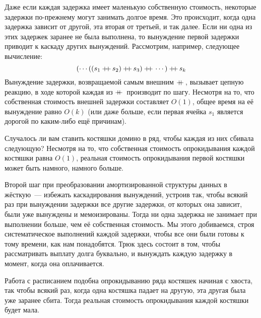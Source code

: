 Даже если каждая задержка имеет маленькую собственную стоимость,
некоторые задержки по-прежнему могут занимать долгое время. Это
происходит, когда одна задержка зависит от другой, эта вторая от
третьей, и так далее. Если ни одна из этих задержек заранее не была
выполнена, то вынуждение первой задержки приводит к каскаду других
вынуждений. Рассмотрим, например, следующее вычисление:
$$
(\cdots((s_1 \concat s_2) \concat s_3) \concat \cdots) \concat s_k
$$
Вынуждение задержки, возвращаемой самым внешним $+\!\!\!+\,$, вызывает
цепную реакцию, в ходе которой каждая из $+\!\!\!+\,$ производит по
шагу. Несмотря на то, что собственная стоимость внешней задержки
составляет $O(1)$, общее время на её вынуждение равно $O(k)$ (или даже
больше, если первая ячейка $s_1$ является дорогой по каким-либо ещё
причинам).
\begin{remark}
  Случалось ли вам ставить костяшки домино в ряд, чтобы каждая из них
  сбивала следующую? Несмотря на то, что собственная стоимость опрокидывания
  каждой костяшки равна $O(1)$, реальная стоимость опрокидывания первой
  костяшки может быть намного, намного больше.
\end{remark}

Второй шаг при преобразовании амортизированной структуры данных в
жёсткую~--- избежать каскадирования вынуждений, устроив так, чтобы
всякий раз при вынуждении задержки все другие задержки, от которых она
зависит, были уже вынуждены и мемоизированы. Тогда ни одна задержка не
занимает при выполнении больше, чем её собственная стоимость. Мы этого
добиваемся, строя систематическое 
выполнений каждой задержки, чтобы все они были готовы к тому времени,
как нам понадобятся. Трюк здесь состоит в том, чтобы рассматривать
выплату долга буквально, и вынуждать каждую задержку в момент, когда
она оплачивается.

\begin{remark}
  Работа с расписанием подобна опрокидыванию ряда костяшек начиная с
  хвоста, так чтобы всякий раз, когда одна костяшка падает на другую,
  эта другая была уже заранее сбита. Тогда реальная стоимость
  опрокидывания каждой костяшки будет мала.
\end{remark}

